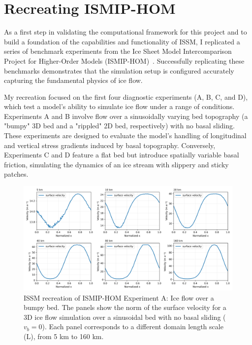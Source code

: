 \section{Recreating ISMIP-HOM}

As a first step in validating the computational framework for this project and to build a foundation of the capabilities and functionality of ISSM, I replicated a series of benchmark experiments from the Ice Sheet Model Intercomparison Project for Higher-Order Models (ISMIP-HOM)~\cite{Pattyn_2008}. Successfully replicating these benchmarks demonstrates that the simulation setup is configured accurately capturing the fundamental physics of ice flow.  

My recreation focused on the first four diagnostic experiments (A, B, C, and D), which test a model's ability to simulate ice flow under a range of conditions. Experiments A and B involve flow over a sinusoidally varying bed topography (a "bumpy" 3D bed and a "rippled" 2D bed, respectively) with no basal sliding. These experiments are designed to evaluate the model's handling of longitudinal and vertical stress gradients induced by basal topography. Conversely, Experiments C and D feature a flat bed but introduce spatially variable basal friction, simulating the dynamics of an ice stream with slippery and sticky patches.

\begin{figure}[H]
    \includegraphics[scale=0.45]{ExpA_velocity_panels.png}
    \caption{ISSM recreation of ISMIP-HOM Experiment A: Ice flow over a bumpy bed. The panels show the norm of the surface velocity for a 3D ice flow simulation over a sinusoidal bed with no basal sliding ($v_b=0$). Each panel corresponds to a different domain length scale (L), from 5 km to 160 km.}
    \label{fig:4.1}
\end{figure}

